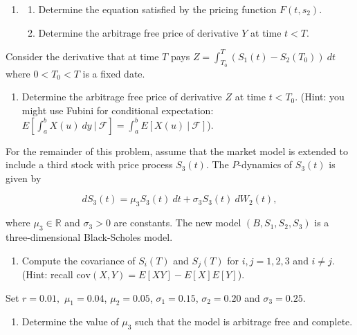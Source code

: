 \documentclass[
]{book}
\providecommand{\tightlist}{%
  \setlength{\itemsep}{0pt}\setlength{\parskip}{0pt}}
\begin{document}
\begin{enumerate}
\def\labelenumi{\alph{enumi}.}
\setcounter{enumi}{3}
\item
  \begin{enumerate}
  \def\labelenumii{\roman{enumii}.}
  \tightlist
  \item
    Determine the equation satisfied by the pricing function \(F(t,s_2)\).
  \item
    Determine the arbitrage free price of derivative \(Y\) at time \(t<T\).
  \end{enumerate}
\end{enumerate}

Consider the derivative that at time \(T\) pays \(Z=\int_{T_0}^T(S_1(t)-S_2(T_0))\ dt\) where \(0<T_0<T\) is a fixed date.

\begin{enumerate}
\def\labelenumi{\alph{enumi}.}
\setcounter{enumi}{4}
\tightlist
\item
  Determine the arbitrage free price of derivative \(Z\) at time \(t<T_0\). (Hint: you might use Fubini for conditional expectation: \(E[\int_a^b X(u)\ dy\ \vert\ \mathcal{F}]=\int_a^bE[X(u)\ \vert\ \mathcal{F}]\)).
\end{enumerate}

For the remainder of this problem, assume that the market model is extended to include a third stock with price process \(S_3(t)\). The \(P\)-dynamics of \(S_3(t)\) is given by

\[
dS_3(t)=\mu_3 S_3(t)\ dt+\sigma_3 S_3(t)\ dW_2(t),
\]

where \(\mu_3\in\mathbb{R}\) and \(\sigma_3>0\) are constants. The new model \((B,S_1,S_2,S_3)\) is a three-dimensional Black-Scholes model.

\begin{enumerate}
\def\labelenumi{\alph{enumi}.}
\setcounter{enumi}{5}
\tightlist
\item
  Compute the covariance of \(S_i(T)\) and \(S_j(T)\) for \(i,j=1,2,3\) and \(i\ne j\). (Hint: recall \(\text{cov}(X,Y)=E[XY]-E[X]E[Y]\)).
\end{enumerate}

Set \(r=0.01,\) \(\mu_1=0.04\), \(\mu_2=0.05\), \(\sigma_1=0.15\), \(\sigma_2=0.20\) and \(\sigma_3=0.25\).

\begin{enumerate}
\def\labelenumi{\alph{enumi}.}
\setcounter{enumi}{6}
\tightlist
\item
  Determine the value of \(\mu_3\) such that the model is arbitrage free and complete.
\end{enumerate}
\end{document}
